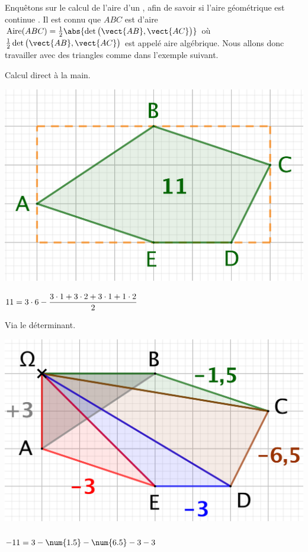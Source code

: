 

Enquêtons sur le calcul de l'aire d'un \ngone, afin de savoir si l'aire géométrique est \og continue \fg. 
Il est connu que $ABC$ est d'aire $\area{ABC} = \frac12 \abs{ \det \big( \vect{AB} , \vect{AC} \big) }$ où $\frac12 \det \big( \vect{AB} , \vect{AC} \big)$ est appelé aire algébrique. Nous allons donc travailler avec des triangles comme dans l'exemple suivant.


\begin{multicols}{2}
	\small\itshape
    \begin{center}
		Calcul direct à la main.

		\smallskip

        \includegraphics[scale=.35]{content/polygon/geo-area/convex-1.png}

       	\smallskip

		$11 = 3 \cdot 6 - \dfrac{3 \cdot 1 + 3 \cdot 2 + 3 \cdot 1 + 1 \cdot 2}{2} \vphantom{\dfrac{2^M}2}$
    \end{center}

	\columnbreak

    \begin{center}
		Via le déterminant.

		\smallskip

        \includegraphics[scale=.35]{content/polygon/geo-area/convex-2.png}

       	\smallskip

		$- 11 = 3 - \num{1.5} - \num{6.5} - 3 - 3 \vphantom{\dfrac{2^M}2}$
    \end{center}
\end{multicols}



